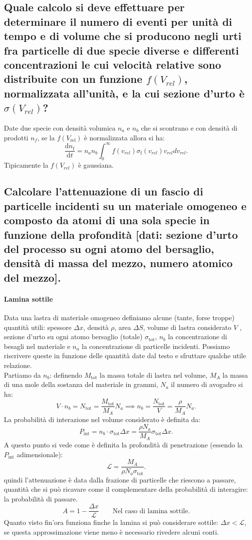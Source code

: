 \subsection[]{  Quale calcolo si deve effettuare per determinare il numero di eventi per unità di tempo e di volume che si producono negli urti fra particelle di due specie diverse e differenti concentrazioni le cui velocità relative sono distribuite con un funzione $f(V_{rel})$, normalizzata all'unità, e la cui sezione d'urto è $\sigma(V_{rel})$?}
Date due specie con densità volumica $n_a$ e  $n_b$ che si scontrano e con densità di prodotti $n_f$, se la $ f\left( V_{\text{rel}} \right) $ è normalizzata allora si ha:
\[
	\frac{\mbox{d} n_{\text{f}}}{\mbox{d} t } = n_a n_b \int_0^{\infty} f\left( v_{rel} \right) \sigma_{\text{f}}\left( v_{rel} \right) v_{rel} dv_{rel}
.\] 
Tipicamente la $f\left( V_{rel} \right)$ è gaussiana. 

\subsection[]{ Calcolare l'attenuazione di un fascio di particelle incidenti su un materiale omogeneo e composto da atomi di una sola specie in funzione della profondità [dati: sezione d'urto del processo su ogni atomo del bersaglio, densità di massa del mezzo, numero atomico del mezzo].}
\paragraph{Lamina sottile}
Data una lastra di materiale omogeneo definiamo alcune (tante, forse troppe) quantità utili: spessore $\Delta x$, densità $\rho$, area $\Delta S$, volume di lastra considerato $V$ , sezione d'urto su ogni atomo bersaglio (totale) $ \sigma_{\text{tot}}$, $n_b$ la concentrazione di besagli nel materiale e $n_a$ la concentrazione di particelle incidenti. Possiamo riscrivere queste in funzione delle quantità date dal testo e sfruttare qualche utile relazione.\\ 
Partiamo da $n_b$: definendo $M_{\text{tot}}$ la massa totale di lastra nel volume, $M_A$ la massa di una mole della sostanza del materiale in grammi, $N_a$ il numero di avogadro si ha:
\[
	V \cdot n_b = N_{\text{tot}} = \frac{M_{\text{tot}}}{M_A} N_a \implies n_b =\frac{N_{\text{tot}}}{V} = \frac{\rho}{M_A} N_a
.\]
La probabilità di interazione nel volume considerato è definita da:
\[
	P_{\text{int}} = n_b \cdot \sigma_{\text{tot}} \Delta x  = \frac{\rho N_a }{M_A} \sigma_{\text{tot}}\Delta x
.\] 
A questo punto si vede come è definita la profondità di penetrazione (essendo la $P_{\text{int}}$ adimensionale):
\[
	\mathcal{L} = \frac{M_A}{\rho N_a\sigma_{\text{tot}}}
.\] 
quindi l'attenuazione è data dalla frazione di particelle che riescono a passare, quantità che si può ricavare come il complementare della probabilità di interagire: la probabilità di passare.
\[
	A = 1 - \frac{\Delta x}{\mathcal{L}} \quad \quad 
	\text{Nel caso di lamina sottile}
.\] 
Quanto visto fin'ora funziona finche la lamina si può considerare sottile: $\Delta x < \mathcal{L}$, se questa approssimazione viene meno è necessario rivedere alcuni conti.
